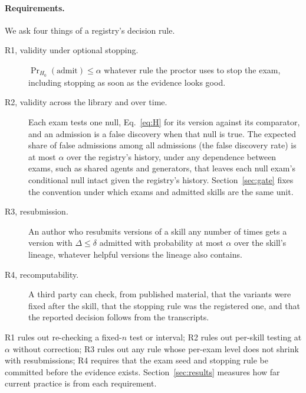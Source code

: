 \paragraph{Requirements.} We ask four things of a registry's decision rule.
\begin{description}
\item[R1, validity under optional stopping.] $\Pr_{H_0}(\text{admit})\le\alpha$ whatever rule the proctor uses to stop the exam, including stopping as soon as the evidence looks good.
\item[R2, validity across the library and over time.] Each exam tests one null, Eq.~\eqref{eq:H} for its version against its comparator, and an admission is a false discovery when that null is true. The expected share of false admissions among all admissions (the false discovery rate) is at most $\alpha$ over the registry's history, under any dependence between exams, such as shared agents and generators, that leaves each null exam's conditional null intact given the registry's history. Section~\ref{sec:gate} fixes the convention under which exams and admitted skills are the same unit.
\item[R3, resubmission.] An author who resubmits versions of a skill any number of times gets a version with $\Delta\le\delta$ admitted with probability at most $\alpha$ over the skill's lineage, whatever helpful versions the lineage also contains.
\item[R4, recomputability.] A third party can check, from published material, that the variants were fixed after the skill, that the stopping rule was the registered one, and that the reported decision follows from the transcripts.
\end{description}
R1 rules out re-checking a fixed-$n$ test or interval; R2 rules out per-skill testing at $\alpha$ without correction; R3 rules out any rule whose per-exam level does not shrink with resubmissions; R4 requires that the exam seed and stopping rule be committed before the evidence exists. Section~\ref{sec:results} measures how far current practice is from each requirement.
